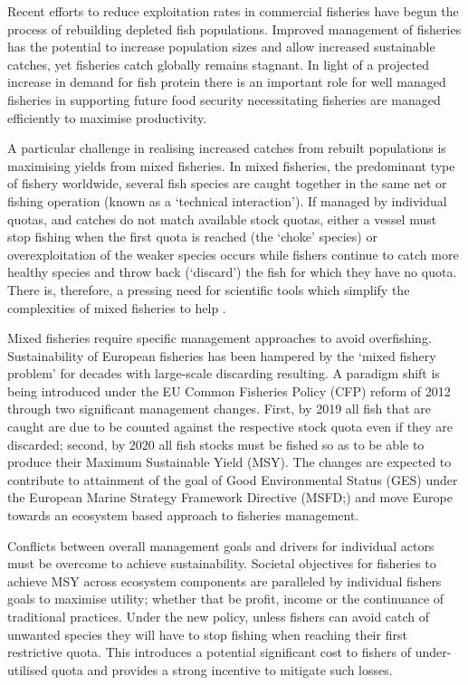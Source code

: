 \documentclass{nature}
\begin{document}
\begin{linenumbers}
Recent efforts to reduce exploitation rates in commercial fisheries have begun
the process of rebuilding depleted fish populations\cite{Worm2009}.  Improved
management of fisheries has the potential to increase population sizes and
allow increased sustainable catches, yet fisheries catch globally remains
stagnant\cite{FAO2016}. In light of a projected increase in demand for fish
protein\cite{B??n??2016} there is an important role for well managed fisheries
in supporting future food security\cite{Mcclanahan2015} necessitating
fisheries are managed efficiently to maximise productivity.

A particular challenge in realising increased catches from rebuilt populations
is maximising yields from mixed fisheries\cite{Branch2008, Kuriyama2016,
	Ulrich2016}. In mixed fisheries, the predominant type of fishery
worldwide, several fish species are caught together in the same net or fishing
operation (known as a `technical interaction'). If managed by individual
quotas, and catches do not match available stock quotas, either a vessel must
stop fishing when the first quota is reached (the `choke' species) or
overexploitation of the weaker species occurs while fishers continue to catch
more healthy species and throw back (`discard') the fish for which they have no
quota\cite{Batsleer2015}. There is, therefore, a pressing need for scientific
tools which simplify the complexities of mixed fisheries to help . 

Mixed fisheries require specific management approaches to avoid overfishing.
Sustainability of European fisheries has been hampered by the `mixed fishery
problem' for decades with large-scale discarding resulting\cite{Borges2015,
	Uhlmann2014}.  A paradigm shift is being introduced under the EU Common
Fisheries Policy (CFP) reform of 2012 through two significant management
changes.  First, by 2019 all fish that are caught are due to be counted against
the respective stock quota even if they are discarded; second, by 2020 all fish
stocks must be fished so as to be able to produce their Maximum Sustainable
Yield (MSY)\cite{EuropeanParliamentandCounciloftheEuropeanUnion2013}. The
changes are expected to contribute to attainment of the goal of Good
Environmental Status (GES) under the European Marine Strategy Framework
Directive (MSFD;\cite{EuropeanParliament2008}) and move Europe towards an
ecosystem based approach to fisheries management\cite{Garcia2003}. 

Conflicts between overall management goals and drivers for individual actors
must be overcome to achieve sustainability. Societal objectives for fisheries
to achieve MSY across ecosystem components are paralleled by individual fishers
goals to maximise utility; whether that be profit, income or the continuance of
traditional practices.  Under the new policy, unless fishers can avoid catch of
unwanted species they will have to stop fishing when reaching their first
restrictive quota. This introduces a potential significant cost to fishers of
under-utilised quota\cite{Hoff2010a, Ulrich2016} and provides a strong
incentive to mitigate such losses\cite{Condie2013, Condie2013a}. 


\end{linenumbers}
\end{document}
